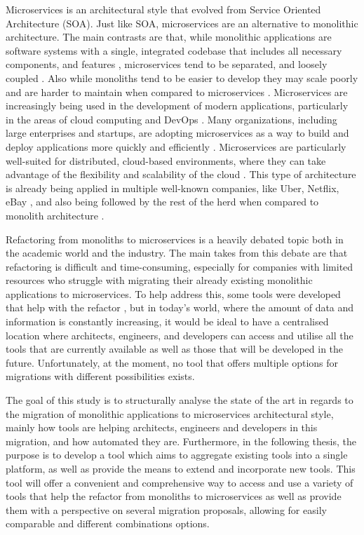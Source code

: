 \documentclass[conference]{IEEEtran}
\begin{document}
Microservices is an architectural style that evolved from Service Oriented
Architecture (SOA). Just like SOA, microservices are an alternative to
monolithic architecture. The main contrasts are that, while monolithic
applications are software systems with a single, integrated codebase that
includes all necessary components, and features
\cite{kazanavivcius2019migrating}, microservices tend to be separated, and
loosely coupled \cite{newman2021building}. Also while monoliths tend to be
easier to develop they may scale poorly and are harder to maintain when
compared to microservices \cite{newman2019monolith}. Microservices are
increasingly being used in the development of modern applications, particularly
in the areas of cloud computing and DevOps \cite{ren2018migrating}. Many
organizations, including large enterprises and startups, are adopting
microservices as a way to build and deploy applications more quickly and
efficiently \cite{richardson-microservices}. Microservices are particularly
well-suited for distributed, cloud-based environments, where they can take
advantage of the flexibility and scalability of the cloud
\cite{fowler-microservices-prerequisites}. This type of architecture is already
being applied in multiple well-known companies, like Uber, Netflix, eBay
\cite{microservices-users}, and also being followed by the rest of the herd
when compared to monolith architecture \cite{taibi2017processes}.

Refactoring from monoliths to microservices is a heavily debated topic both in
the academic world and the industry. The main takes from this debate are that
refactoring is difficult and time-consuming, especially for companies with
limited resources who struggle with migrating their already existing monolithic
applications to microservices. To help address this, some tools were developed
that help with the refactor , but in today's world, where the
amount of data and information is constantly increasing, it would be ideal to
have a centralised location where architects, engineers, and developers can
access and utilise all the tools that are currently available as well as those
that will be developed in the future. Unfortunately, at the moment, no tool
that offers multiple options for migrations with different possibilities
exists.

The goal of this study is to structurally analyse the state of the art in
regards to the migration of monolithic applications to microservices
architectural style, mainly how tools are helping architects, engineers and
developers in this migration, and how automated they are. Furthermore, in the
following thesis, the purpose is to develop a tool which aims to aggregate
existing tools into a single platform, as well as provide the means to extend
and incorporate new tools. This tool will offer a convenient and comprehensive
way to access and use a variety of tools that help the refactor from monoliths
to microservices as well as provide them with a perspective on several
migration proposals, allowing for easily comparable and different combinations
options.
\end{document}
